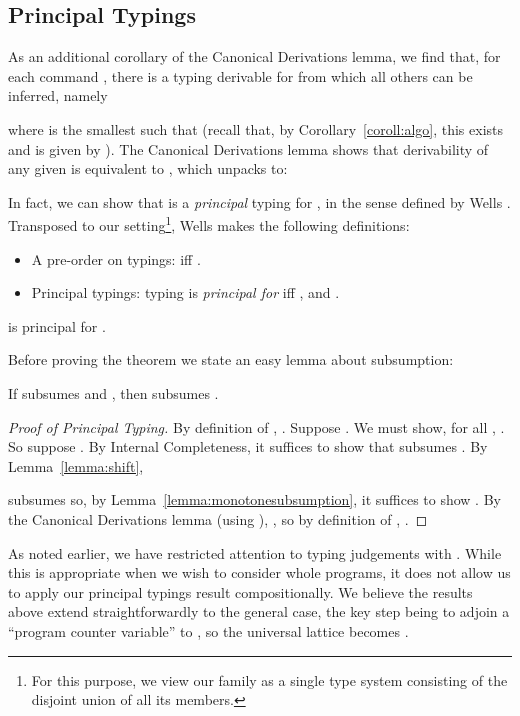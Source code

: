\documentclass{sigplanconf}
\begin{document}
\begin{table}
\subsection{Principal Typings}\label{sect:principal}
As an additional corollary of the Canonical Derivations lemma, we find that, for each
command , there is a typing derivable for
 from which all others can be inferred, namely

where  is the smallest  such that 
(recall that, by Corollary~\ref{coroll:algo}, this exists and is given by
).
The Canonical Derivations lemma shows that
derivability of any given
 is equivalent
to , which unpacks to:

In fact, we can show that  is a \emph{principal} typing
for , in the sense defined by Wells \cite{Wells:ICALP-2002}.
Transposed to our setting\footnote{For this purpose, we view our family as a single type system consisting of the disjoint
union of all its members.},
Wells makes the following definitions:
\begin{itemize}
\item A pre-order on typings:  iff .
\item Principal typings: typing  is \emph{principal for}  iff , and
.
\end{itemize}
\begin{theorem}
 is principal for .
\end{theorem}
Before proving the theorem we state an easy lemma about subsumption:
\begin{lemma}\label{lemma:monotonesubsumption}
If  subsumes  and , then
 subsumes .
\end{lemma}
\begin{proof}[Proof of Principal Typing]
By definition of , . Suppose
.
We must show, for all , .
So suppose . By Internal Completeness, it suffices to show
that  subsumes .
By Lemma~\ref{lemma:shift},

subsumes
 so, by Lemma~\ref{lemma:monotonesubsumption},
it suffices to show .
By the Canonical Derivations lemma (using ),
, so by definition of ,
.
\end{proof}

As noted earlier, we have restricted attention to typing judgements
 with . While this is appropriate
when we wish to consider whole programs, it does not allow us to apply
our principal typings result compositionally. We believe the results above
extend straightforwardly to the general case, the key step being to
adjoin a ``program counter variable'' to , so the universal lattice
becomes .


\end{table}
\end{document}

